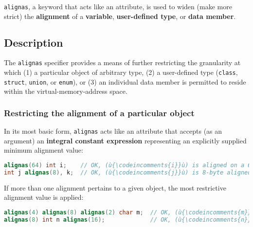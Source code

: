 

\texttt{alignas}, a keyword that acts like an attribute, is used to widen (make more strict)
the \textbf{alignment} of a \textbf{variable}, \textbf{user-defined
type}, or \textbf{data member}.

\subsection[Description]{Description}\label{description}

The \texttt{alignas} specifier provides a means of further restricting
the granularity at which (1) a particular object of arbitrary type, (2)
a user-defined type (\texttt{class}, \texttt{struct}, \texttt{union}, or
\texttt{enum}), or (3) an individual data member is permitted to reside
within the virtual-memory-address space.

\subsubsection[Restricting the alignment of a particular object]{Restricting the alignment of a particular object}\label{restricting-the-alignment-of-a-particular-object}

In its most basic form, \texttt{alignas} acts like an
attribute that accepts (as an argument) an
\textbf{integral constant expression} representing an explicitly
supplied minimum alignment value:

\begin{lstlisting}[language=C++]
alignas(64) int i;    // OK, (ù{\codeincomments{i}}ù) is aligned on a 64-byte address boundary.
int j alignas(8), k;  // OK, (ù{\codeincomments{j}}ù) is 8-byte aligned; (ù{\codeincomments{k}}ù) remains naturally aligned.
\end{lstlisting}

\noindent If more than one alignment pertains to a given object, the most
restrictive alignment value is applied:

\begin{lstlisting}[language=C++]
alignas(4) alignas(8) alignas(2) char m;  // OK, (ù{\codeincomments{m}}ù) is 8-byte aligned.
alignas(8) int n alignas(16);             // OK, (ù{\codeincomments{n}}ù) is 16-byte aligned.
\end{lstlisting}

